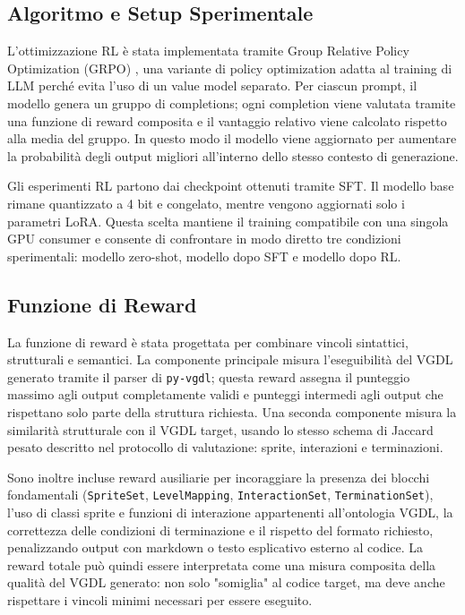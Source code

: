 \documentclass[final,5p,times,twocolumn]{elsarticle}
\begin{document}
\subsection{Algoritmo e Setup Sperimentale}

L'ottimizzazione RL \`e stata implementata tramite Group Relative Policy Optimization (GRPO) \citep{shao2024deepseekmath}, una variante di policy optimization adatta al training di LLM perch\'e evita l'uso di un value model separato. Per ciascun prompt, il modello genera un gruppo di completions; ogni completion viene valutata tramite una funzione di reward composita e il vantaggio relativo viene calcolato rispetto alla media del gruppo. In questo modo il modello viene aggiornato per aumentare la probabilit\`a degli output migliori all'interno dello stesso contesto di generazione.

Gli esperimenti RL partono dai checkpoint ottenuti tramite SFT. Il modello base rimane quantizzato a 4 bit e congelato, mentre vengono aggiornati solo i parametri LoRA. Questa scelta mantiene il training compatibile con una singola GPU consumer e consente di confrontare in modo diretto tre condizioni sperimentali: modello zero-shot, modello dopo SFT e modello dopo RL.

\subsection{Funzione di Reward}

La funzione di reward \`e stata progettata per combinare vincoli sintattici, strutturali e semantici. La componente principale misura l'eseguibilit\`a del VGDL generato tramite il parser di \texttt{py-vgdl}; questa reward assegna il punteggio massimo agli output completamente validi e punteggi intermedi agli output che rispettano solo parte della struttura richiesta. Una seconda componente misura la similarit\`a strutturale con il VGDL target, usando lo stesso schema di Jaccard pesato descritto nel protocollo di valutazione: sprite, interazioni e terminazioni.

Sono inoltre incluse reward ausiliarie per incoraggiare la presenza dei blocchi fondamentali (\texttt{SpriteSet}, \texttt{LevelMapping}, \texttt{InteractionSet}, \texttt{TerminationSet}), l'uso di classi sprite e funzioni di interazione appartenenti all'ontologia VGDL, la correttezza delle condizioni di terminazione e il rispetto del formato richiesto, penalizzando output con markdown o testo esplicativo esterno al codice. La reward totale pu\`o quindi essere interpretata come una misura composita della qualit\`a del VGDL generato: non solo "somiglia" al codice target, ma deve anche rispettare i vincoli minimi necessari per essere eseguito.
\end{document}
